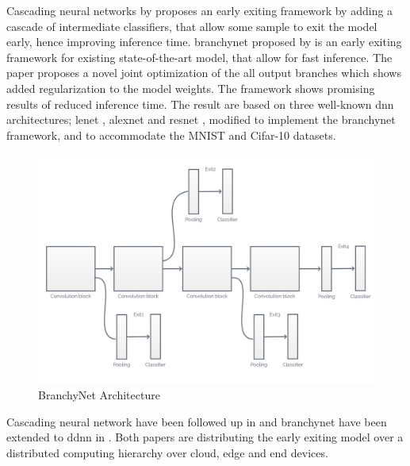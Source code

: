 Cascading neural networks \cite{leroux_resource-constrained_2015} by \citeauthor{leroux_resource-constrained_2015} proposes an early exiting framework by adding a cascade of intermediate classifiers, that allow some sample to exit the model early, hence improving inference time. \gls{branchynet} \cite{teerapittayanon_branchynet:_2016} proposed by \citeauthor{teerapittayanon_branchynet:_2016} is an early exiting framework for existing state-of-the-art model, that allow for fast inference. The paper proposes a novel joint optimization of the all output branches which shows added regularization to the model weights. The framework shows promising results of reduced inference time. The result are based on three well-known \gls{dnn} architectures; \gls{lenet} \cite{lecun_lecun-98.pdf_1998}, \gls{alexnet} \cite{krizhevsky_imagenet_2017} and \gls{resnet} \cite{he_deep_2015}, modified to implement the \gls{branchynet} framework, and to accommodate the MNIST \cite{lecun_mnist_2010} and Cifar-10 \cite{krizhevsky_cifar-10_nodate} datasets.

\begin{figure}
	\centering
	\includegraphics[width=\linewidth]{figures/models/branchy}
	\caption[BranchyNet Architecture]{BranchyNet Architecture}
\end{figure}

Cascading neural network \cite{leroux_resource-constrained_2015} have been followed up in \cite{leroux_cascading_2017} and \gls{branchynet} have been extended to \gls{ddnn} in \cite{teerapittayanon_distributed_2017}. Both papers are distributing the early exiting model over a distributed computing hierarchy over cloud, edge and end devices.  

